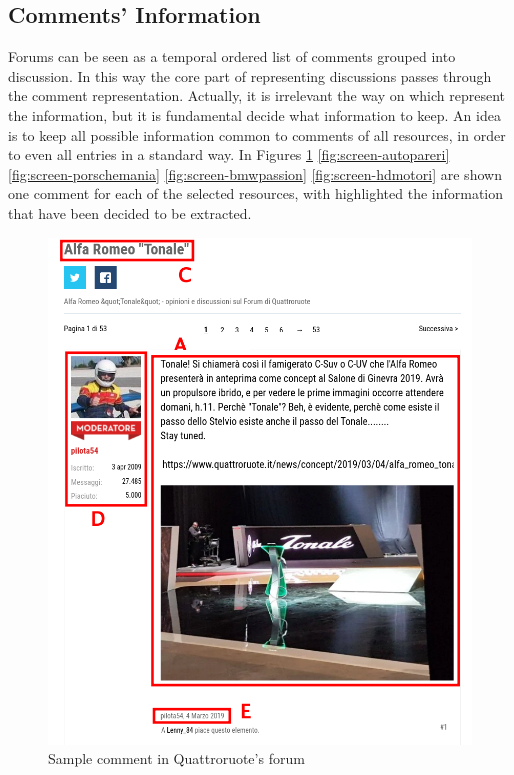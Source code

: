 \subsection{Comments' Information}

Forums can be seen as a temporal ordered list of comments grouped into discussion. In this way the core part of representing discussions passes through the comment representation. Actually, it is irrelevant the way on which represent the information, but it is fundamental decide what information to keep. An idea is to keep all possible information common to comments of all resources, in order to even all entries in a standard way. In Figures \ref{fig:screen-quattroruote} \ref{fig:screen-autopareri} \ref{fig:screen-porschemania} \ref{fig:screen-bmwpassion} \ref{fig:screen-hdmotori} are shown one comment for each of the selected resources, with highlighted the information that have been decided to be extracted.

\begin{figure}[!hb]
	\centering
	\includegraphics[width=1\textwidth]{figures/screen/screen-quattroruote.png}
	\caption{Sample comment in Quattroruote's forum}
	\label{fig:screen-quattroruote}
\end{figure}

